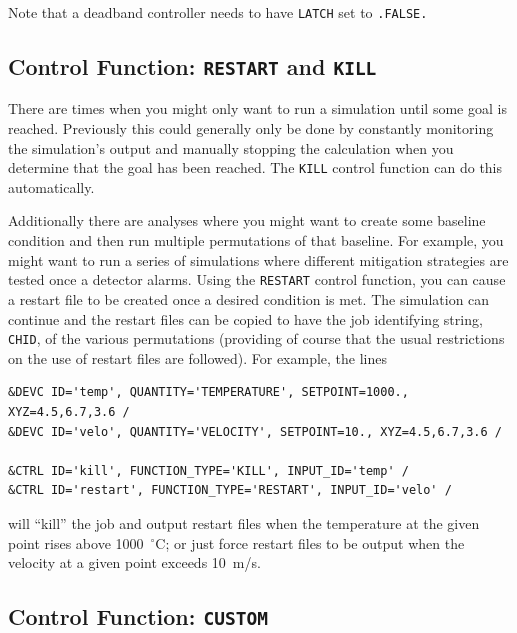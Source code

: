 \documentclass[11pt]{book}
\newcommand{\ct}{\tt\small}
\begin{document}
\begin{warning}
Note that a deadband controller needs to have {\ct LATCH} set to {\ct .FALSE.}
\end{warning}

\subsection{Control Function: \texorpdfstring{{\tt RESTART} and {\tt KILL}} {RESTARTKILL} }

There are times when you might only want to run a simulation until some
goal is reached.  Previously this could generally only be done by
constantly monitoring the simulation's output and manually stopping
the calculation when you determine that the goal has been reached.  The
{\ct KILL} control function can do this automatically.

Additionally there are analyses where you might want to create some
baseline condition and then run multiple permutations of that baseline.
For example, you might want to run a series of simulations where
different mitigation strategies are tested once a detector alarms.
Using the {\ct RESTART}
control function, you can cause a restart file
to be created once a desired condition is met.  The simulation can
continue and the restart files can be copied to have the job identifying string, {\ct CHID}, of
the various permutations (providing of course that the usual
restrictions on the use of restart files are followed).
For example, the lines

\footnotesize
\begin{verbatim}
&DEVC ID='temp', QUANTITY='TEMPERATURE', SETPOINT=1000., XYZ=4.5,6.7,3.6 /
&DEVC ID='velo', QUANTITY='VELOCITY', SETPOINT=10., XYZ=4.5,6.7,3.6 /

&CTRL ID='kill', FUNCTION_TYPE='KILL', INPUT_ID='temp' /
&CTRL ID='restart', FUNCTION_TYPE='RESTART', INPUT_ID='velo' /
\end{verbatim} \normalsize

\noindent
will ``kill'' the job and output restart files when the temperature at the given point rises above
1000~$^\circ$C; or just force restart files to be output when the velocity at a given point exceeds 10~m/s.



\subsection{Control Function: \texorpdfstring{{\tt CUSTOM}}{CUSTOM} }
\label{info:CUSTOM}
\end{document}
